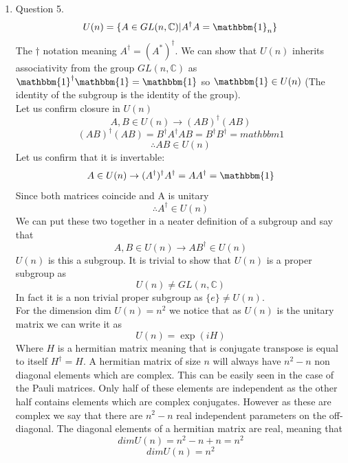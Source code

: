 \documentclass[12pt]{article}
\begin{document}
\begin{enumerate}
\item Question 5.
$$ U(n) = \{A \in GL(n,\mathbb{C}) | A^\dagger A = \mathbbm{1}_n\} $$
The $\dagger$ notation meaning $A^\dagger = (A^*)^\dagger $. We can show that $U(n)$ inherits associativity from the group $GL(n,\mathbb{C})$ as $\mathbbm{1}^\dagger \mathbbm{1} = \mathbbm{1}$ so $ \mathbbm{1} \in U(n)$ (The identity of the subgroup is the identity of the group).
\\ Let us confirm closure in $U(n)$
$$ A,B \in U(n) \rightarrow (AB)^\dagger (AB) $$
$$ (AB)^\dagger (AB) = B^\dagger A^\dagger AB = B^\dagger B^\dagger = mathbbm{1} $$
$$ \therefore AB \in U(n) $$
Let us confirm that it is invertable: 
$$ A \in U(n) \rightarrow (A^\dagger)^\dagger A^\dagger = AA^\dagger = \mathbbm{1} $$
Since both matrices coincide and A is unitary 
$$ \therefore A^\dagger \in U(n) $$
We can put these two together in a neater definition of a subgroup and say that 
$$ A,B \in U(n) \rightarrow AB^\dagger \in U(n) $$ 
$U(n)$ is this a subgroup. It is trivial to show that $U(n)$ is a proper subgroup as 
$$ U(n) \neq GL(n,\mathbb{C}) $$
In fact it is a non trivial proper subgroup as $\{e\} \neq U(n)$. 
\\
For the dimension dim $U(n) = n^2$ we notice that as $U(n)$ is the unitary matrix we can write it as 
$$ U(n) = \exp(iH) $$
Where $H$ is a hermitian matrix meaning that is conjugate transpose is equal to itself $H^\dagger = H$. A hermitian matrix of size $n$ will always have $n^2 -n$ non diagonal elements which are complex. This can be easily seen in the case of the Pauli matrices. Only half of these elements are independent as the other half contains elements which are complex conjugates. However as these are complex we say that there are $n^2 -n$ real independent parameters on the off-diagonal. The diagonal elements of a hermitian matrix are real, meaning that 
$$ dim U(n) = n^2 - n +n = n^2 $$ 
$$ dim U(n) = n^2 $$ 
\end{enumerate}
\end{document}
